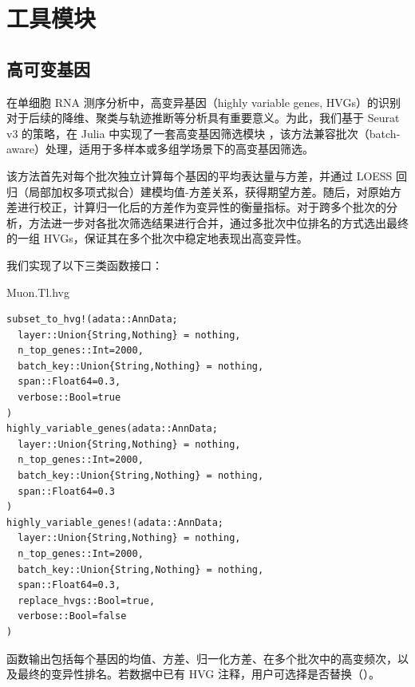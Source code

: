\section{工具模块}

\subsection{高可变基因}

在单细胞 RNA 测序分析中，高变异基因（highly variable genes, HVGs）的识别对于后续的降维、聚类与轨迹推断等分析具有重要意义。为此，我们基于 Seurat v3 的策略，在 Julia 中实现了一套高变基因筛选模块 ，该方法兼容批次（batch-aware）处理，适用于多样本或多组学场景下的高变基因筛选。

该方法首先对每个批次独立计算每个基因的平均表达量与方差，并通过 LOESS 回归（局部加权多项式拟合）建模均值-方差关系，获得期望方差。随后，对原始方差进行校正，计算归一化后的方差作为变异性的衡量指标。对于跨多个批次的分析，方法进一步对各批次筛选结果进行合并，通过多批次中位排名的方式选出最终的一组 HVGs，保证其在多个批次中稳定地表现出高变异性。

我们实现了以下三类函数接口：

\begin{fancybox}{Muon.Tl.hvg}
\begin{lstlisting}
subset_to_hvg!(adata::AnnData;
  layer::Union{String,Nothing} = nothing,
  n_top_genes::Int=2000,
  batch_key::Union{String,Nothing} = nothing,
  span::Float64=0.3,
  verbose::Bool=true
)
highly_variable_genes(adata::AnnData;
  layer::Union{String,Nothing} = nothing,
  n_top_genes::Int=2000,
  batch_key::Union{String,Nothing} = nothing,
  span::Float64=0.3
)
highly_variable_genes!(adata::AnnData;
  layer::Union{String,Nothing} = nothing,
  n_top_genes::Int=2000,
  batch_key::Union{String,Nothing} = nothing,
  span::Float64=0.3,
  replace_hvgs::Bool=true,
  verbose::Bool=false
)
\end{lstlisting}
\end{fancybox}

函数输出包括每个基因的均值、方差、归一化方差、在多个批次中的高变频次，以及最终的变异性排名。若数据中已有 HVG 注释，用户可选择是否替换（）。


